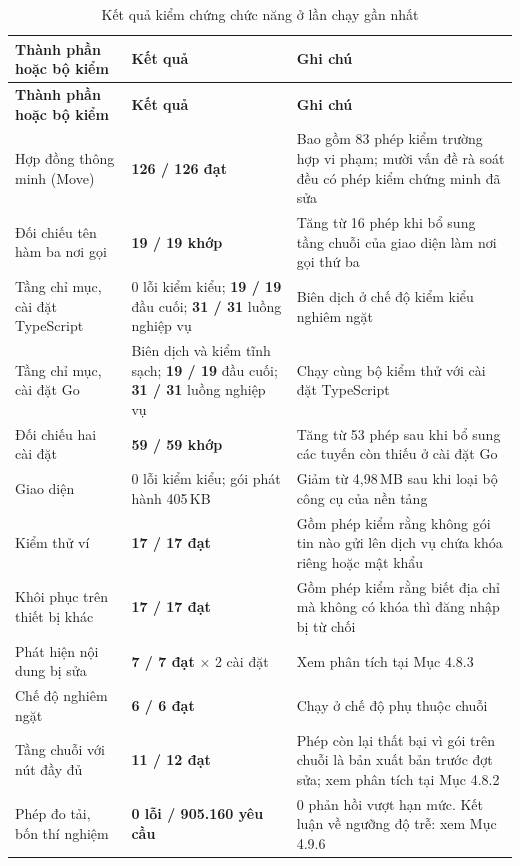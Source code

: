 \begin{longtable}{|p{5.4cm}|p{3.1cm}|p{5.2cm}|}
\caption{Kết quả kiểm chứng chức năng ở lần chạy gần nhất}
\label{tab:test-results} \\

\hline
\textbf{Thành phần hoặc bộ kiểm} & \textbf{Kết quả} & \textbf{Ghi chú} \\
\hline
\endfirsthead

\hline
\textbf{Thành phần hoặc bộ kiểm} & \textbf{Kết quả} & \textbf{Ghi chú} \\
\hline
\endhead

\hline
\endfoot

\hline
\endlastfoot

Hợp đồng thông minh (Move)
& \textbf{126 / 126 đạt}
& Bao gồm 83 phép kiểm trường hợp vi phạm; mười vấn đề rà soát đều có phép kiểm chứng minh đã sửa \\
\hline

Đối chiếu tên hàm ba nơi gọi
& \textbf{19 / 19 khớp}
& Tăng từ 16 phép khi bổ sung tầng chuỗi của giao diện làm nơi gọi thứ ba \\
\hline

Tầng chỉ mục, cài đặt TypeScript
& 0 lỗi kiểm kiểu; \textbf{19 / 19} đầu cuối; \textbf{31 / 31} luồng nghiệp vụ
& Biên dịch ở chế độ kiểm kiểu nghiêm ngặt \\
\hline

Tầng chỉ mục, cài đặt Go
& Biên dịch và kiểm tĩnh sạch; \textbf{19 / 19} đầu cuối; \textbf{31 / 31} luồng nghiệp vụ
& Chạy cùng bộ kiểm thử với cài đặt TypeScript \\
\hline

Đối chiếu hai cài đặt
& \textbf{59 / 59 khớp}
& Tăng từ 53 phép sau khi bổ sung các tuyến còn thiếu ở cài đặt Go \\
\hline

Giao diện
& 0 lỗi kiểm kiểu; gói phát hành 405\,KB
& Giảm từ 4,98\,MB sau khi loại bộ công cụ của nền tảng \\
\hline

Kiểm thử ví
& \textbf{17 / 17 đạt}
& Gồm phép kiểm rằng không gói tin nào gửi lên dịch vụ chứa khóa riêng hoặc mật khẩu \\
\hline

Khôi phục trên thiết bị khác
& \textbf{17 / 17 đạt}
& Gồm phép kiểm rằng biết địa chỉ mà không có khóa thì đăng nhập bị từ chối \\
\hline

Phát hiện nội dung bị sửa
& \textbf{7 / 7 đạt} $\times$ 2 cài đặt
& Xem phân tích tại Mục 4.8.3 \\
\hline

Chế độ nghiêm ngặt
& \textbf{6 / 6 đạt}
& Chạy ở chế độ phụ thuộc chuỗi \\
\hline

Tầng chuỗi với nút đầy đủ
& \textbf{11 / 12 đạt}
& Phép còn lại thất bại vì gói trên chuỗi là bản xuất bản trước đợt sửa; xem phân tích tại Mục 4.8.2 \\
\hline

Phép đo tải, bốn thí nghiệm
& \textbf{0 lỗi / 905.160 yêu cầu}
& 0 phản hồi vượt hạn mức. Kết luận về ngưỡng độ trễ: xem Mục 4.9.6 \\
\hline

\end{longtable}
